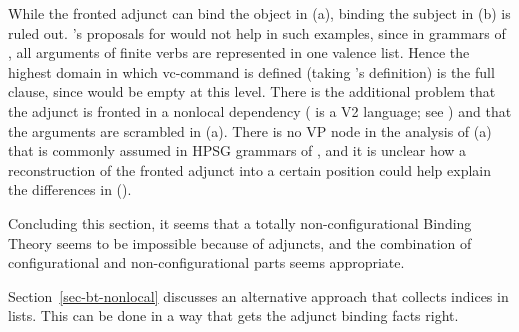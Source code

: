 \documentclass[output=paper,biblatex,babelshorthands,newtxmath,draftmode,colorlinks,citecolor=brown]{langscibook}
\begin{document}
\largerpage[2]
While the fronted adjunct can bind the object in (a), binding the subject in (b) is
ruled out. \citeauthor{Walker2011a}'s proposals for  would not help in such examples, since in grammars of , all arguments of
finite verbs are represented in one valence list. Hence the highest domain in
which vc-command is defined (taking \citeauthor{HL95b}'s definition) is the full clause, since \comps
would be empty at this level. There is the additional problem that the adjunct is fronted in a
nonlocal dependency ( is a V2 language; see \cites[Chapter~2.4]{Erdmann1886a}[, ]{Paul1919a}[Section~3]{MuellerGermanHandbook}) and that the arguments are scrambled in
(a). There is no VP node in the analysis of (a) that is commonly assumed in HPSG
grammars of , and it is unclear how a reconstruction of the fronted adjunct into a certain
position could help explain the differences in ().




Concluding this section, it seems that a totally non-configurational Binding Theory seems to be
impossible because of adjuncts, and the combination of configurational and non-configurational parts
seems appropriate. 

Section~\ref{sec-bt-nonlocal} discusses an alternative approach that collects indices in lists. This can be done in a
way that gets the adjunct binding facts right.
 
\end{document}

